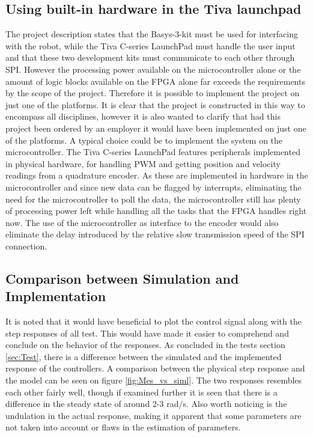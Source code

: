 \documentclass[../../main.tex]{subfiles}
\begin{document}
\subsection*{Using built-in hardware in the Tiva launchpad}
The project description states that the Basys-3-kit must be used for interfacing with the robot, while the Tiva C-series LaunchPad must handle the user input and that these two development kits must communicate to each other through SPI. However the processing power available on the microcontroller alone or the amount of logic blocks available on the FPGA alone far exceeds the requirements by the scope of the project. Therefore it is possible to implement the project on just one of the platforms. It is clear that the project is constructed in this way to encompass all disciplines, however it is also wanted to clarify that had this project been ordered by an employer it would have been implemented on just one of the platforms. A typical choice could be to implement the system on the microcontroller. The Tiva C-series LaunchPad features peripherals implemented in physical hardware, for handling PWM and getting position and velocity readings from a quadrature encoder. As these are implemented in hardware in the microcontroller and since new data can be flagged by interrupts, eliminating the need for the microcontroller to poll the data, the microcontroller still has plenty of processing power left while handling all the tasks that the FPGA handles right now. The use of the microcontroller as interface to the encoder would also eliminate the delay introduced by the relative slow transmission speed of the SPI connection.      


\subsection*{Comparison between Simulation and Implementation}
It is noted that it would have beneficial to plot the control signal along with the step responses of all test. This would have made it easier to comprehend and conclude on the behavior of the responses. 
As concluded in the tests section \ref{sec:Test}, there is a difference between the simulated and the implemented response of the controllers. A comparison between the physical step response and the model can be seen on figure \ref{fig:Mes_vs_siml}. The two responses resembles each other fairly well, though if examined further it is seen that there is a difference in the steady state of around 2-3 \si{rad/s}. Also worth noticing is the undulation in the actual response, making it apparent that some parameters are not taken into account or flaws in the estimation of parameters. 
\end{document}

